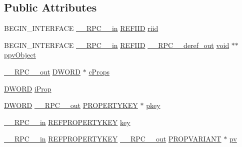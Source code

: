 \subsection*{Public Attributes}
\begin{DoxyCompactItemize}
\item 
B\+E\+G\+I\+N\+\_\+\+I\+N\+T\+E\+R\+F\+A\+CE \hyperlink{rpcsal_8h_a20b7f6da600a05c8b541659f14f7f0e6}{\+\_\+\+\_\+\+R\+P\+C\+\_\+\+\_\+in} \hyperlink{px__win__ds_8c_a80ec49c8ae61e234197d5071d2df497d}{R\+E\+F\+I\+ID} \hyperlink{struct_i_property_store_vtbl_a7bf5f41e9ba97dfc1e17a166a25fd080}{riid}
\item 
B\+E\+G\+I\+N\+\_\+\+I\+N\+T\+E\+R\+F\+A\+CE \hyperlink{rpcsal_8h_a20b7f6da600a05c8b541659f14f7f0e6}{\+\_\+\+\_\+\+R\+P\+C\+\_\+\+\_\+in} \hyperlink{px__win__ds_8c_a80ec49c8ae61e234197d5071d2df497d}{R\+E\+F\+I\+ID} \hyperlink{rpcsal_8h_a23bc188526f10656f9c79d950f6c3192}{\+\_\+\+\_\+\+R\+P\+C\+\_\+\+\_\+deref\+\_\+out} \hyperlink{sound_8c_ae35f5844602719cf66324f4de2a658b3}{void} $\ast$$\ast$ \hyperlink{struct_i_property_store_vtbl_a1df1b1be37b35281766920a996cb3bba}{ppv\+Object}
\item 
\hyperlink{rpcsal_8h_aa518a2c78d44d75f3685c32c455c5ed8}{\+\_\+\+\_\+\+R\+P\+C\+\_\+\+\_\+out} \hyperlink{mapinls_8h_ad342ac907eb044443153a22f964bf0af}{D\+W\+O\+RD} $\ast$ \hyperlink{struct_i_property_store_vtbl_a08df261f486d12621854c14c142c778e}{c\+Props}
\item 
\hyperlink{mapinls_8h_ad342ac907eb044443153a22f964bf0af}{D\+W\+O\+RD} \hyperlink{struct_i_property_store_vtbl_ae1dda2ada854a1f211d96dd2991fbd19}{i\+Prop}
\item 
\hyperlink{mapinls_8h_ad342ac907eb044443153a22f964bf0af}{D\+W\+O\+RD} \hyperlink{rpcsal_8h_aa518a2c78d44d75f3685c32c455c5ed8}{\+\_\+\+\_\+\+R\+P\+C\+\_\+\+\_\+out} \hyperlink{pa__win__wasapi_8c_aa83c2fbe06e13eff5ff331ba4a302659}{P\+R\+O\+P\+E\+R\+T\+Y\+K\+EY} $\ast$ \hyperlink{struct_i_property_store_vtbl_ada2d8e075fc63635721a47674ca847f6}{pkey}
\item 
\hyperlink{rpcsal_8h_a20b7f6da600a05c8b541659f14f7f0e6}{\+\_\+\+\_\+\+R\+P\+C\+\_\+\+\_\+in} \hyperlink{propkeydef_8h_a3e01280fe3a0b979f5a1926d5a8754af}{R\+E\+F\+P\+R\+O\+P\+E\+R\+T\+Y\+K\+EY} \hyperlink{struct_i_property_store_vtbl_a78fd64ec63cedc4138981c035217ee45}{key}
\item 
\hyperlink{rpcsal_8h_a20b7f6da600a05c8b541659f14f7f0e6}{\+\_\+\+\_\+\+R\+P\+C\+\_\+\+\_\+in} \hyperlink{propkeydef_8h_a3e01280fe3a0b979f5a1926d5a8754af}{R\+E\+F\+P\+R\+O\+P\+E\+R\+T\+Y\+K\+EY} \hyperlink{rpcsal_8h_aa518a2c78d44d75f3685c32c455c5ed8}{\+\_\+\+\_\+\+R\+P\+C\+\_\+\+\_\+out} \hyperlink{propidl_8h_ae902c1757cd16052896846fa4ebb88d8}{P\+R\+O\+P\+V\+A\+R\+I\+A\+NT} $\ast$ \hyperlink{struct_i_property_store_vtbl_ab9b082ceebbf24e7d85f7865e2ddb40d}{pv}
$$
\end{DoxyCompactItemize}
